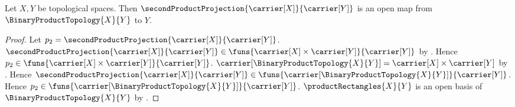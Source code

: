 \begin{theorem}\label{second_product_projection_is_open_map}
    Let $X,Y$ be topological spaces.
    Then $\secondProductProjection{\carrier[X]}{\carrier[Y]}$ is an open
        map from $\BinaryProductTopology{X}{Y}$ to $Y$.
\end{theorem}
\begin{proof}
    Let $p_2=\secondProductProjection{\carrier[X]}{\carrier[Y]}$.
    $\secondProductProjection{\carrier[X]}{\carrier[Y]}\in
        \funs{\carrier[X]\times\carrier[Y]}{\carrier[Y]}$ by
        .
    Hence $p_2\in\funs{
        \carrier[X]\times\carrier[Y]}{\carrier[Y]}$.
    $\carrier[\BinaryProductTopology{X}{Y}]
        =\carrier[X]\times\carrier[Y]$ by
        .
    Hence $\secondProductProjection{\carrier[X]}{\carrier[Y]}\in
        \funs{\carrier[\BinaryProductTopology{X}{Y}]}{\carrier[Y]}$.
    Hence $p_2\in\funs{
        \carrier[\BinaryProductTopology{X}{Y}]}{\carrier[Y]}$.
    $\productRectangles{X}{Y}$ is an open basis of
        $\BinaryProductTopology{X}{Y}$ by
        .


\end{proof}
